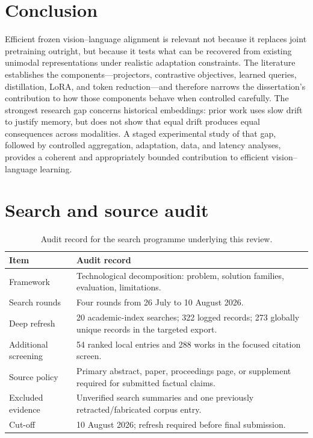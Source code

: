 \documentclass[11pt,a4paper]{article}
\begin{document}
\section{Conclusion}

Efficient frozen vision--language alignment is relevant not because it replaces
joint pretraining outright, but because it tests what can be recovered from
existing unimodal representations under realistic adaptation constraints. The
literature establishes the components---projectors, contrastive objectives,
learned queries, distillation, LoRA, and token reduction---and therefore narrows
the dissertation's contribution to how those components behave when controlled
carefully. The strongest research gap concerns historical embeddings: prior work
uses slow drift to justify memory, but does not show that equal drift produces
equal consequences across modalities. A staged experimental study of that gap,
followed by controlled aggregation, adaptation, data, and latency analyses,
provides a coherent and appropriately bounded contribution to efficient
vision--language learning.

\appendix
\section{Search and source audit}

\begin{table}[htbp]
\centering
\small
\caption{Audit record for the search programme underlying this review.}
\label{tab:audit}
\begin{tabularx}{\textwidth}{L{3.0cm}Y}
\toprule
\textbf{Item} & \textbf{Audit record} \\
\midrule
Framework & Technological decomposition: problem, solution families, evaluation, limitations. \\
Search rounds & Four rounds from 26 July to 10 August 2026. \\
Deep refresh & 20 academic-index searches; 322 logged records; 273 globally unique records in the targeted export. \\
Additional screening & 54 ranked local entries and 288 works in the focused citation screen. \\
Source policy & Primary abstract, paper, proceedings page, or supplement required for submitted factual claims. \\
Excluded evidence & Unverified search summaries and one previously retracted/fabricated corpus entry. \\
Cut-off & 10 August 2026; refresh required before final submission. \\
\bottomrule
\end{tabularx}
\end{table}
\end{document}
